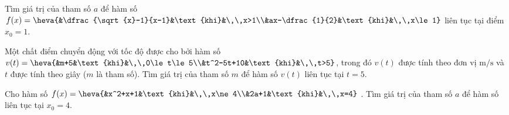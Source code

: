 \begin{ex}%
Tìm giá trị của tham số $a$ để hàm số $f(x)=\heva{&\dfrac{\sqrt{x}-1}{x-1}&\text{khi}&\,\,x>1\\&ax-\dfrac{1}{2}&\text{khi}&\,\,x\le 1}$  liên tục tại điểm $x_0=1$.
\end{ex}

\begin{ex}%
Một chất điểm chuyển động với tốc độ được cho bởi hàm số\\ $v(t)=\heva{&m+5&\text{khi}&\,\,0\le t\le 5\\&t^2-5t+10&\text{khi}&\,\,t>5}$, 
trong đó $v(t)$ được tính theo đơn vị $\mathrm{m/s}$ và $t$ được tính theo giây ($m$ là tham số). Tìm giá trị của tham số $m$ để hàm số $v(t)$ liên tục tại $t=5$.
\end{ex}

\begin{ex}%
Cho hàm số $f(x)=\heva{&x^2+x+1&\text{khi}&\,\,x\ne 4\\&2a+1&\text{khi}&\,\,x=4}$ .
Tìm giá trị của tham số $a$  để hàm số liên tục tại $x_0=4$.  
\end{ex}


